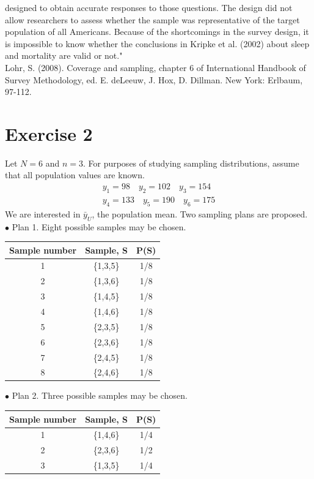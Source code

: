 \documentclass[12pt]{article}
\begin{document}
\begin{enumerate}
{\begin{minipage}[t]{0.97\linewidth}
\begin{flushleft}
{designed to obtain accurate responses to those questions. The design did not allow researchers to assess whether the sample was representative of the target population
of all Americans. Because of the shortcomings in the survey design, it is impossible
to know whether the conclusions in Kripke et al. (2002) about sleep and mortality
are valid or not.}"  \\
\footnotesize Lohr, S. (2008). Coverage and sampling, chapter 6 of International Handbook of
Survey Methodology, ed. E. deLeeuw, J. Hox, D. Dillman. New York: Erlbaum, 97-112.
\end{flushleft}
\end{minipage}}
\end{enumerate}

\section*{Exercise 2}
Let $N=6$ and $n=3$. For purposes of studying sampling distributions, assume that all
population values are known. 
\begin{eqnarray*}
y_1=98 \quad y_2=102 \quad y_3=154 \\
y_4=133 \quad y_5=190 \quad y_6=175
\end{eqnarray*}
We are interested in $\bar{y}_U$, the population mean. Two sampling plans are proposed.\\
$\bullet$ Plan 1. Eight possible samples may be chosen.
\begin{center}
\begin{tabular}{ccc}
Sample number & Sample, S & P(S)\\
\hline
1 &\{1,3,5\}& 1/8\\
2 &\{1,3,6\}& 1/8\\
3 &\{1,4,5\}& 1/8\\
4 &\{1,4,6\}& 1/8\\
5 &\{2,3,5\}& 1/8\\
6 &\{2,3,6\}& 1/8\\
7 &\{2,4,5\}& 1/8\\
8 &\{2,4,6\}& 1/8\\
\end{tabular}
\end{center}
$\bullet$ Plan 2. Three possible samples may be chosen.

\begin{center}
\begin{tabular}{ccc}
Sample number & Sample, S & P(S)\\
\hline
1 &\{1,4,6\}& 1/4\\
2 &\{2,3,6\}& 1/2\\
3 &\{1,3,5\}& 1/4\\
\end{tabular}
\end{center}
\end{document}
